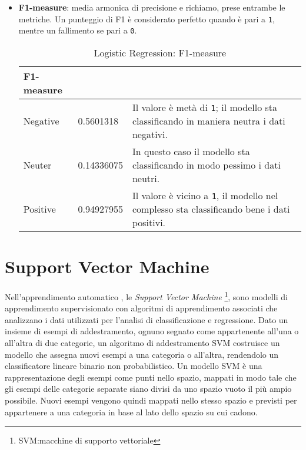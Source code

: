 \begin{itemize}
				\item \textbf{F1-measure}: media armonica di precisione e richiamo, prese entrambe le metriche. Un punteggio di F1 è considerato perfetto quando è pari a \verb|1|, mentre un fallimento se pari a \verb|0|. 
				\begin{table} [H]
					\caption{Logistic Regression: F1-measure} 
					\label{tab:F1-measureLogisticRegression}
					\centering
					\begin{tabular}{llp{}}
						\toprule 
						\textbf{F1-measure}	\\
						\midrule
						Negative  & 0.5601318  & Il valore è metà di \verb|1|; il modello sta classificando in maniera neutra i dati negativi.\\
						Neuter & 0.14336075 & In questo caso il modello sta classificando in modo pessimo i dati neutri.\\
						Positive & 0.94927955 & Il valore è vicino a \verb|1|, il modello nel complesso sta classificando bene i dati positivi.\\
						\bottomrule
					\end{tabular}
				\end{table} 
				
			\end{itemize}
			

		\section{Support Vector Machine}
			Nell'apprendimento automatico , le \textit{Support Vector Machine} \footnote{SVM:macchine di supporto vettoriale}, sono modelli di apprendimento supervisionato con algoritmi di apprendimento associati che analizzano i dati utilizzati per l'analisi di classificazione e regressione. Dato un insieme di esempi di addestramento, ognuno segnato come appartenente all'una o all'altra di due categorie, un algoritmo di addestramento SVM costruisce un modello che assegna nuovi esempi a una categoria o all'altra, rendendolo un classificatore lineare binario non probabilistico. Un modello SVM è una rappresentazione degli esempi come punti nello spazio, mappati in modo tale che gli esempi delle categorie separate siano divisi da uno spazio vuoto il più ampio possibile. Nuovi esempi vengono quindi mappati nello stesso spazio e previsti per appartenere a una categoria in base al lato dello spazio su cui cadono.
			
